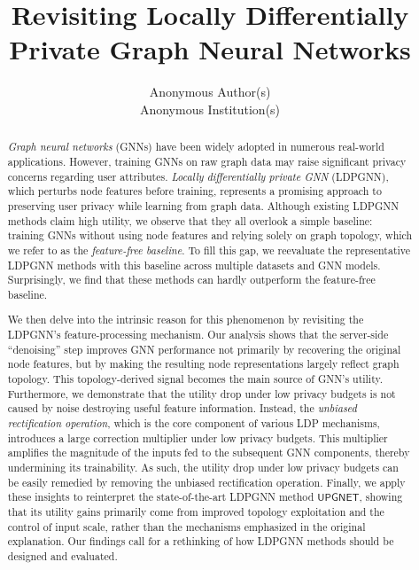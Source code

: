 \documentclass[conference,compsoc]{IEEEtran}
\theoremstyle{boldplain}
\theoremstyle{bolddefinition}
\theoremstyle{remark}
\newcommand{\ldpgnn}{LDPGNN\xspace}
\newcommand{\upgnet}{\ensuremath{\mathsf{UPGNET}}\xspace}
\begin{document}
\title{Revisiting Locally Differentially Private Graph Neural Networks}


\author{
{
\rm Anonymous Author(s)} \\
Anonymous Institution(s)
}

\maketitle
\begin{abstract}













\textit{Graph neural networks} (GNNs) have been widely adopted in numerous real-world applications. 
However, training GNNs on raw graph data may raise significant privacy concerns regarding user attributes. 
\textit{Locally differentially private GNN} (\ldpgnn), which perturbs node features before training, represents a promising approach to preserving user privacy while learning from graph data. 
Although existing \ldpgnn methods claim high utility, we observe that they all overlook a simple baseline: training GNNs without using node features and relying solely on graph topology, which we refer to as the \textit{feature-free baseline}. 
To fill this gap, we reevaluate the representative \ldpgnn methods with this baseline across multiple datasets and GNN models.
Surprisingly, we find that these methods can hardly outperform the feature-free baseline.

We then delve into the intrinsic reason for this phenomenon by revisiting the \ldpgnn's feature-processing mechanism.
Our analysis shows that the server-side ``denoising'' step improves GNN performance not primarily by recovering the original node features, but by making the resulting node representations largely reflect graph topology.  
This topology-derived signal becomes the main source of GNN's utility.
Furthermore, we demonstrate that the utility drop under low privacy budgets is not caused by noise destroying useful feature information.
Instead, the \textit{unbiased rectification operation}, which is the core component of various LDP mechanisms, introduces a large correction multiplier under low privacy budgets.
This multiplier amplifies the magnitude of the inputs fed to the subsequent GNN components, thereby undermining its trainability.
As such, the utility drop under low privacy budgets can be easily remedied by removing the unbiased rectification operation.
Finally, we apply these insights to reinterpret the state-of-the-art \ldpgnn method \upgnet, showing that its utility gains primarily come from improved topology exploitation and the control of input scale, rather than the mechanisms emphasized in the original explanation.
Our findings call for a rethinking of how \ldpgnn methods should be designed and evaluated.

\end{abstract}
\end{document}
